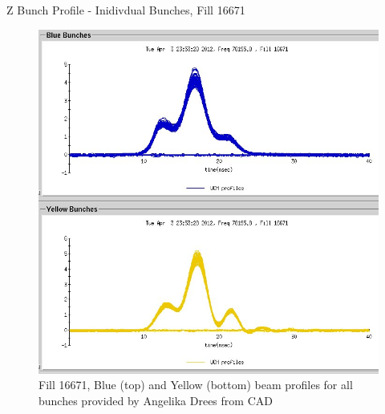 \begin{frame}{Z Bunch Profile - Inidivdual Bunches, Fill 16671}
\begin{figure}
\begin{center}
\includegraphics[width=0.5\linewidth]{../ZBunchProfileStudies/figs/wcm_16671.jpeg}
\end{center}
\caption{ Fill 16671, Blue (top) and Yellow (bottom) beam profiles for all bunches provided by Angelika Drees from CAD}
\label{fig:wcm_16671}
\end{figure}
\end{frame}
